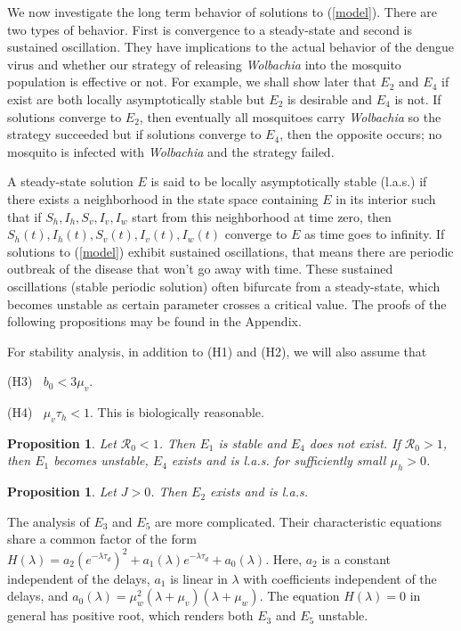 \documentclass[12pt,leqno]{article}
\newtheorem{Proposition}[Theorem]{Proposition}%
\begin{document}
We now investigate the long term behavior of solutions to (\ref{model}). There are two types of behavior. First is convergence to a steady-state and second is sustained oscillation. They have implications to the actual behavior of the dengue virus and whether our strategy of releasing {\it Wolbachia} into the mosquito population is effective or not. For example, we shall show later that $E_2$ and $E_4$ if exist are both locally asymptotically stable but $E_2$ is desirable and $E_4$ is not. If solutions converge to $E_2$, then eventually all mosquitoes carry {\it Wolbachia} so the strategy succeeded but if solutions converge to $E_4$, then the opposite occurs; no mosquito is infected with {\it Wolbachia} and the strategy failed.\smallskip

A steady-state solution $E$ is said to be locally asymptotically stable (l.a.s.) if there exists a neighborhood in the state space containing $E$ in its interior such that if $S_h,I_h,S_v,I_v,I_w$ start from this neighborhood at time zero, then $S_h(t),I_h(t),S_v(t),I_v(t),I_w(t)$ converge to $E$ as time goes to infinity. If solutions to (\ref{model}) exhibit sustained oscillations, that means there are periodic outbreak of the disease that won't go away with time. These sustained oscillations (stable periodic solution) often bifurcate from a steady-state, which becomes unstable as certain parameter crosses a critical value. The proofs of the following propositions may be found in the Appendix.\smallskip

For stability analysis, in addition to (H1) and (H2), we will also assume that\smallskip

(H3) $\;\;b_0 < 3\mu_v.$\smallskip

(H4) $\;\;\mu_v\tau_h < 1$. This is biologically reasonable.\smallskip

\begin{Proposition}\label{E1E4stable}
Let $\mathcal{R}_0 < 1$. Then $E_1$ is stable and $E_4$ does not exist. If $\mathcal{R}_0 > 1$, then $E_1$ becomes unstable, $E_4$ exists and is l.a.s. for sufficiently small $\mu_h > 0$.
\end{Proposition}

\begin{Proposition}\label{E2stable}
Let $J > 0$. Then $E_2$ exists and is l.a.s.
\end{Proposition}

The analysis of $E_3$ and $E_5$ are more complicated. Their characteristic equations share a common factor of the form
$H(\lambda) = a_2 (e^{-\lambda \tau_d})^2 + a_1(\lambda) e^{-\lambda\tau_d} + a_0(\lambda).$ Here, $a_2$ is a constant independent of the delays, $a_1$ is linear in $\lambda$ with coefficients independent of the delays, and $a_0(\lambda) = \mu_w^2(\lambda + \mu_v)(\lambda + \mu_w)$. The equation $H(\lambda)=0$ in general has positive root, which renders both $E_3$ and $E_5$ unstable.
\end{document}
